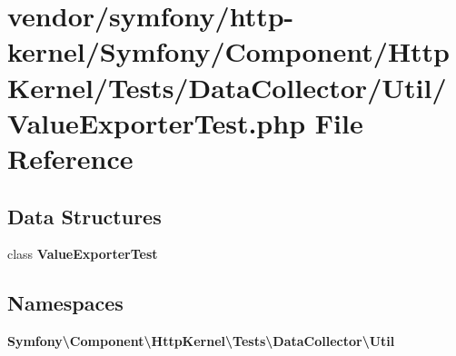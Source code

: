 \section{vendor/symfony/http-\/kernel/\+Symfony/\+Component/\+Http\+Kernel/\+Tests/\+Data\+Collector/\+Util/\+Value\+Exporter\+Test.php File Reference}
\label{_value_exporter_test_8php}
\subsection*{Data Structures}
\begin{DoxyCompactItemize}
\item 
class {\bf Value\+Exporter\+Test}
\end{DoxyCompactItemize}
\subsection*{Namespaces}
\begin{DoxyCompactItemize}
\item 
 {\bf Symfony\textbackslash{}\+Component\textbackslash{}\+Http\+Kernel\textbackslash{}\+Tests\textbackslash{}\+Data\+Collector\textbackslash{}\+Util}
\end{DoxyCompactItemize}
